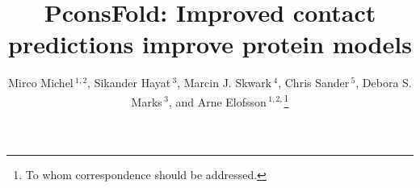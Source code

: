 \documentclass{bioinfo}
\begin{document}

\title[PconsFold]{PconsFold: Improved contact predictions improve
 protein models}
\author[M.Michel \textit{et~al}]{Mirco Michel\,$^{1,2}$, Sikander
  Hayat\,$^{3}$, Marcin J. Skwark\,$^{4}$, Chris Sander\,$^{5}$, Debora
  S. Marks\,$^{3}$,  and Arne Elofsson\,$^{1,2,}$\footnote{To whom correspondence should be addressed.}}
\address{$^{1}$Department of Biochemistry and Biophysics, Stockholm University, 10691 Stockholm, Sweden, 
$^{2}$Science for Life Laboratory, Box 1031, 17121 Solna, Sweden, 
$^{3}$Department of Systems Biology, Harvard Medical School, Boston, Massachusetts, USA, 
$^{4}$Department of Information and Computer Science, Aalto University, PO Box 15400, FI-00076 Aalto, Finland, and
$^{5}$Computational Biology Center, Memorial Sloan-Kettering Cancer Center, New York, New York, USA}



\maketitle
\end{document}
